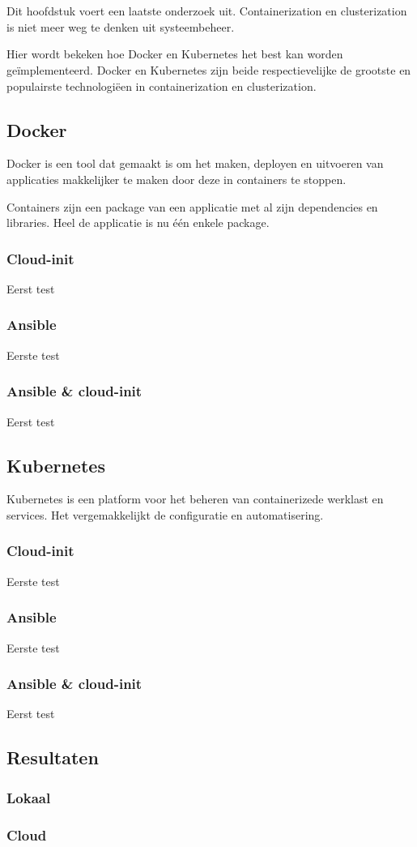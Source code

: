 \chapter{}
\label{ch:container}
Dit hoofdstuk voert een laatste onderzoek uit. Containerization en clusterization is niet meer weg te denken uit systeembeheer. 

Hier wordt bekeken hoe Docker en Kubernetes het best kan worden geïmplementeerd. Docker en Kubernetes zijn beide respectievelijke de grootste en populairste technologiëen in containerization en clusterization.

\section{Docker}
Docker is een tool dat gemaakt is om het maken, deployen en uitvoeren van applicaties makkelijker te maken door deze in containers te stoppen. 

Containers zijn een package van een applicatie met al zijn dependencies en libraries. Heel de applicatie is nu één enkele package. \autocite{docker}


\subsection{Cloud-init}
Eerst test

\subsection{Ansible}
Eerste test

\subsection{Ansible \& cloud-init}
Eerst test

\section{Kubernetes}
Kubernetes is een platform voor het beheren van containerizede werklast en services. Het vergemakkelijkt de configuratie en automatisering.

\subsection{Cloud-init}
Eerste test

\subsection{Ansible}
Eerste test

\subsection{Ansible \& cloud-init}
Eerst test

\section{Resultaten}

\subsection{Lokaal}

\subsection{Cloud}
